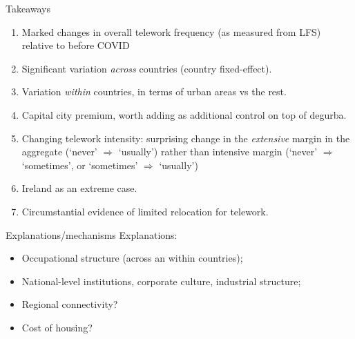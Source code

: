 \documentclass[10pt,handout]{beamer}
\begin{document}
\begin{frame}{Takeaways}

\begin{enumerate}
\item Marked changes in overall telework frequency (as measured from LFS) relative to before COVID
\item Significant variation \emph{across} countries (country fixed-effect).
\item Variation \emph{within} countries, in terms of urban areas vs the rest.
\item Capital city premium, worth adding as additional control on top of degurba.
\item Changing telework intensity: surprising change in the \emph{extensive} margin in the aggregate (`never' $\Rightarrow$ `usually') rather than intensive margin (`never' $\Rightarrow$ `sometimes', or `sometimes' $\Rightarrow$ `usually')
\item Ireland as an extreme case.
\item Circumstantial evidence of limited relocation for telework.
\end{enumerate}

\end{frame}

\begin{frame}{Explanations/mechanisms}
Explanations:
\begin{itemize}
  \item Occupational structure (across an within countries);
  \item National-level institutions, corporate culture, industrial structure;
  \item Regional connectivity?
  \item Cost of housing?
\end{itemize}
\end{frame}
\end{document}
